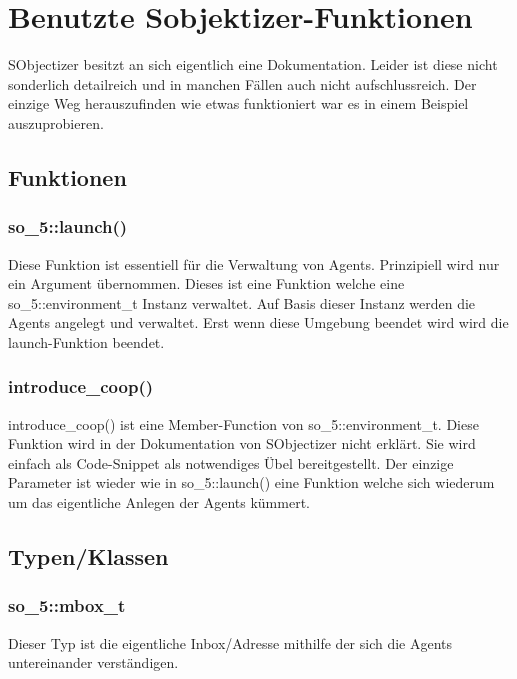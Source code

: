 \chapter{Benutzte Sobjektizer-Funktionen}

\vspace{10mm}

SObjectizer besitzt an sich eigentlich eine Dokumentation. Leider ist diese
nicht sonderlich detailreich und in manchen Fällen auch nicht aufschlussreich.
Der einzige Weg herauszufinden wie etwas funktioniert war es in einem Beispiel auszuprobieren.

\section{Funktionen}

\subsection{so\_5::launch()}
Diese Funktion ist essentiell für die Verwaltung von Agents. Prinzipiell wird nur ein Argument übernommen.
Dieses ist eine Funktion welche eine so\_5::environment\_t Instanz verwaltet. Auf Basis dieser Instanz werden
die Agents angelegt und verwaltet. Erst wenn diese Umgebung beendet wird wird die launch-Funktion beendet.

\subsection{introduce\_coop()}
introduce\_coop() ist eine Member-Function von so\_5::environment\_t. Diese Funktion wird in der Dokumentation von
SObjectizer nicht erklärt. Sie wird einfach als Code-Snippet als notwendiges Übel bereitgestellt. Der einzige
Parameter ist wieder wie in so\_5::launch() eine Funktion welche sich wiederum um das eigentliche Anlegen der
Agents kümmert.

\section{Typen/Klassen}

\subsection{so\_5::mbox\_t}
Dieser Typ ist die eigentliche Inbox/Adresse mithilfe der sich die Agents untereinander verständigen.
